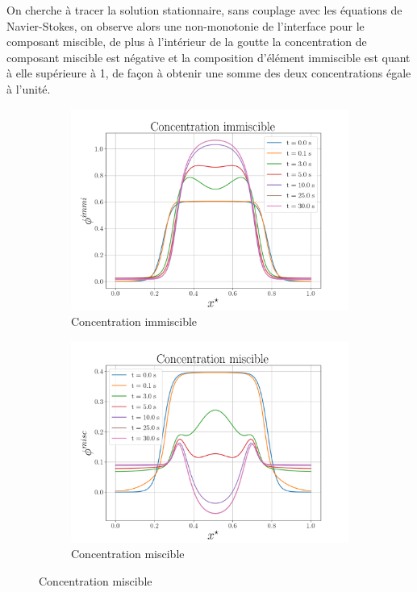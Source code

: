 On cherche à tracer la solution stationnaire, sans couplage avec les équations de Navier-Stokes, on observe alors une non-monotonie de l'interface pour le composant miscible, de plus à l'intérieur de la goutte la concentration de composant miscible est négative et la composition d'élément immiscible est quant à elle supérieure à 1, de façon à obtenir une somme des deux concentrations égale à l'unité.
\begin{figure}[H]
	\centering
	\begin{subfigure}[H]{0.45\textwidth}
		\centering
		\includegraphics[width=\textwidth]{figure/nouveau_parametrage/immiscible_New_Parametrage.png}
		\caption{Concentration immiscible}
		\label{fig:y equals x}
	\end{subfigure}
	\hfill
	\begin{subfigure}[H]{0.45\textwidth}
		\centering
		\includegraphics[width=\textwidth]{figure/nouveau_parametrage/miscible_New_Parametrage.png}
		\caption{Concentration miscible}
		\label{fig:y equals x}
	\end{subfigure}
\end{figure} \vspace{-0.8cm}
